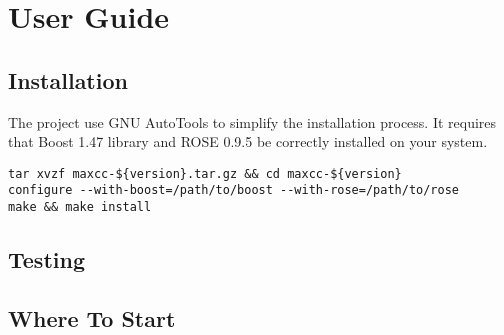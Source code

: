 \chapter{User Guide}

\section{Installation}

The project use GNU AutoTools \cite{Autotools}to simplify the
installation process.  It requires that Boost 1.47 library
\cite{boost1.47} and ROSE 0.9.5\cite{ROSE} be correctly installed on
your system.

\begin{lstlisting}
tar xvzf maxcc-${version}.tar.gz && cd maxcc-${version}
configure --with-boost=/path/to/boost --with-rose=/path/to/rose
make && make install
\end{lstlisting}

\section{Testing}

\section{Where To Start}